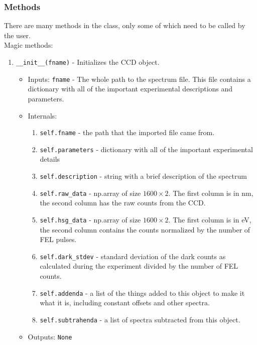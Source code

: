 \documentclass{article}
\newcommand{\code}{\texttt}
\begin{document}
\subsubsection{Methods}
There are many methods in the class, only some of which need to be called by the user.\\
Magic methods:
\begin{enumerate}
	\item \code{\_\_init\_\_(fname)} - Initializes the CCD object. 
	\begin{itemize}
		\item Inputs: \code{fname} - The whole path to the spectrum file.  This file contains a dictionary with all of the important experimental descriptions and parameters.
		\item Internals: 
		\begin{enumerate}
			\item \code{self.fname} - the path that the imported file came from.
			\item \code{self.parameters} - dictionary with all of the important experimental details
			\item \code{self.description} - string with a brief description of the spectrum
			\item \code{self.raw\_data} - np.array of size $1600\times2$. The first column is in nm, the second column has the raw counts from the CCD.
			\item \code{self.hsg\_data} - np.array of size $1600\times2$. The first column is in eV, the second column contains the counts normalized by the number of FEL pulses.
			\item \code{self.dark\_stdev} - standard deviation of the dark counts as calculated during the experiment divided by the number of FEL counts.
			\item \code{self.addenda} - a list of the things added to this object to make it what it is, including constant offsets and other spectra.
			\item \code{self.subtrahenda} - a list of spectra subtracted from this object.
		\end{enumerate}
		\item Outputs: \code{None}
	\end{itemize}
	

\end{enumerate}
\end{document}

